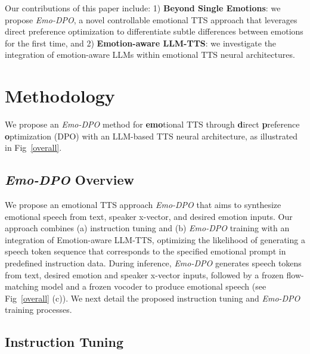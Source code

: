 Our contributions of this paper include: 1) \textbf{Beyond Single Emotions}: we propose \textit{Emo-DPO}, a novel controllable emotional TTS approach that leverages direct preference optimization to differentiate subtle differences between emotions for the first time, and
2) \textbf{Emotion-aware LLM-TTS}: we investigate the integration of emotion-aware LLMs within emotional TTS neural architectures.

\section{Methodology}
\vspace{-0.1cm}
We propose an \textit{Emo-DPO} method for \textbf{emo}tional TTS through \textbf{d}irect \textbf{p}reference \textbf{o}ptimization (DPO) with an LLM-based TTS neural architecture, as illustrated in Fig~\ref{overall}. 

\vspace{-0.1cm}
\subsection{\textit{Emo-DPO} Overview}
\vspace{-0.1cm}
We propose an emotional TTS approach \textit{Emo-DPO} that aims to synthesize emotional speech from text, speaker x-vector, and desired emotion inputs. Our approach combines (a) instruction tuning and (b) \textit{Emo-DPO} training with an integration of Emotion-aware LLM-TTS, optimizing the likelihood of generating a speech token sequence that corresponds to the specified emotional prompt in predefined instruction data. During inference, \textit{Emo-DPO} generates speech tokens from text, desired emotion and speaker x-vector inputs, followed by a frozen flow-matching model and a frozen vocoder to produce emotional speech (see Fig~\ref{overall} (c)). We next detail the proposed instruction tuning and \textit{Emo-DPO} training processes.

\vspace{-0.1cm}
\subsection{Instruction Tuning}
\vspace{-0.1cm}

